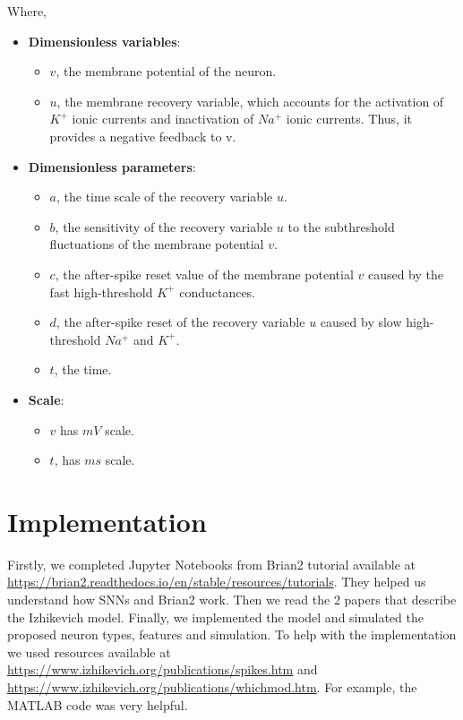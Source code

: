\documentclass{article} %
\begin{document}
Where, 
\begin{itemize}
    \item \textbf{Dimensionless variables}:
     \begin{itemize}
        \item \(v\), the membrane potential of the neuron.
        \item \(u\), the membrane recovery variable, which accounts for the activation of \(K^+\) ionic currents and inactivation of \(Na^+\) ionic currents. Thus, it provides a negative feedback to v.
    \end{itemize}
    \item \textbf{Dimensionless parameters}:
     \begin{itemize}
        \item \(a\), the time scale of the recovery variable \(u\). 
        \item \(b\), the sensitivity of the recovery variable \(u\) to the subthreshold fluctuations of the membrane potential \(v\).
        \item \(c\), the after-spike reset value of the membrane potential \(v\) caused by the fast high-threshold \(K^+\) conductances.
        \item \(d\), the after-spike reset of the recovery variable \(u\) caused by slow high-threshold \(Na^+\) and \(K^+\).
        \item \(t\), the time.
     \end{itemize}
     \item \textbf{Scale}:
      \begin{itemize}
        \item \(v\) has \(mV\) scale.
        \item \(t\), has \(ms\) scale.
     \end{itemize}
     
\end{itemize}

\section{Implementation}

Firstly, we completed Jupyter Notebooks from Brian2 tutorial available at \url{https://brian2.readthedocs.io/en/stable/resources/tutorials}. They helped us understand how SNNs and Brian2 work. Then we read the 2 papers \cite{Izhikevich2003Simple} \cite{Izhikevich2004Which} that describe the Izhikevich model. Finally, we implemented the model and simulated the proposed neuron types, features and simulation. To help with the implementation we used resources available at \url{https://www.izhikevich.org/publications/spikes.htm} and \url{https://www.izhikevich.org/publications/whichmod.htm}. For example, the MATLAB code was very helpful.
\end{document}

